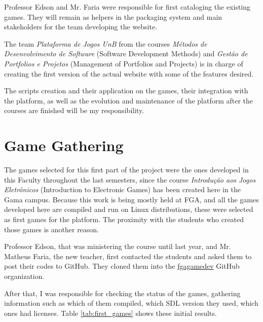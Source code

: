 Professor Edson and Mr. Faria were responsible for first cataloging the existing games. They will remain as helpers in the packaging system and main stakeholders for the team developing the website.

The team \textit{Plataforma de Jogos UnB} from the courses \textit{M\'etodos de Desenvolvimento de Software} (Software Development Methods) and \textit{Gest\~ao de Portfolios e Projetos} (Management of Portfolios and Projects) is in charge of creating the first version of the actual website with some of the features desired.

The scripts creation and their application on the games, their integration with the platform, as well as the evolution and maintenance of the platform after the courses are finished will be my responsibility.


\section{Game Gathering}
\label{sec:game_gathering}

The games selected for this first part of the project were the ones developed in this Faculty throughout the last semesters, since the course \textit{Introdu\c{c}\~ao aos Jogos Eletr\^onicos} (Introduction to Electronic Games) has been created here in the Gama campus. Because this work is being mostly held at FGA, and all the games developed here are compiled and run on Linux distributions, these were selected as first games for the platform. The proximity with the students who created those games is another reason.

Professor Edson, that was ministering the course until last year, and Mr. Matheus Faria, the new teacher, first contacted the students and asked them to post their codes to GitHub. They cloned them into the \href{https://github.com/fgagamedev/}{fgagamedev} GitHub organization.

After that, I was responsible for checking the status of the games, gathering information such as which of them compiled, which SDL version they used, which ones had licenses. Table \ref{tab:first_games} shows these initial results.

